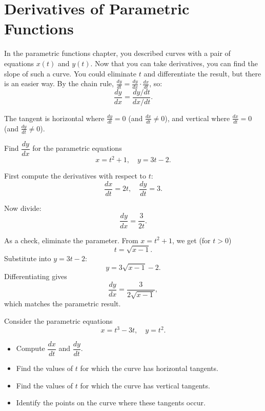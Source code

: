 \section{Derivatives of Parametric Functions}
In the parametric functions chapter, you described curves with a pair of
equations $x(t)$ and $y(t)$. Now that you can take derivatives, you can
find the slope of such a curve.
You could eliminate $t$ and differentiate the result, but there is an
easier way. By the chain rule, $\frac{dy}{dt} = \frac{dy}{dx}\cdot\frac{dx}{dt}$,
so:
\begin{equation*}
    \frac{dy}{dx} = \frac{dy/dt}{dx/dt}.
\end{equation*}

The tangent is horizontal where $\frac{dy}{dt} = 0$ (and $\frac{dx}{dt}
\neq 0$), and vertical where $\frac{dx}{dt} = 0$ (and $\frac{dy}{dt} \neq
0$).


\begin{Worked}
\begin{Problem}
Find $\dfrac{dy}{dx}$ for the parametric equations
\[
    x = t^2 + 1, \quad y = 3t - 2.
\]
\end{Problem}
\begin{Solution}
First compute the derivatives with respect to $t$:
\[
    \frac{dx}{dt} = 2t, \quad \frac{dy}{dt} = 3.
\]

Now divide:
\[
    \frac{dy}{dx} = \frac{3}{2t}.
\]

As a check, eliminate the parameter. From $x = t^2 + 1$, we get (for $t > 0$)
\[
    t = \sqrt{x - 1}.
\]
Substitute into $y = 3t - 2$:
\[
    y = 3\sqrt{x - 1} - 2.
\]
Differentiating gives
\[
    \frac{dy}{dx} = \frac{3}{2\sqrt{x - 1}},
\]
which matches the parametric result.
\end{Solution}
\end{Worked}


\begin{Exercise}[label = parametric3]

    Consider the parametric equations
    \begin{equation*}
        x = t^3 - 3t, \quad y = t^2.
    \end{equation*}

    \begin{itemize}
        \item[(a)] Compute $\dfrac{dx}{dt}$ and $\dfrac{dy}{dt}$.
        \item[(b)] Find the values of $t$ for which the curve has horizontal tangents.
        \item[(c)] Find the values of $t$ for which the curve has vertical tangents.
        \item[(d)] Identify the points on the curve where these tangents occur.
    \end{itemize}
\end{Exercise}

